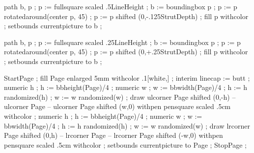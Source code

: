 
\usemodule[s][abr-02]
\usemodule[s][pre-60]






\setupcolors
  [textcolor=darkcolor]

\setupinteraction
  [color=darkcolor,
   contrastcolor=darkcolor]

    path b, p ;
    p := fullsquare scaled .5LineHeight ;
    b := boundingbox p ;
    p := p rotatedaround(center p, 45) ;
    p := p shifted (0,-.125StrutDepth) ;
    fill p withcolor  ;
    setbounds currentpicture to b ;
\stopuseMPgraphic

    path b, p ;
    p := fullsquare scaled .25LineHeight ;
    b := boundingbox p ;
    p := p rotatedaround(center p, 45) ;
    p := p shifted (0,+.25StrutDepth) ;
    fill p withcolor  ;
    setbounds currentpicture to b ;
\stopuseMPgraphic

    StartPage ;
        fill Page enlarged 5mm withcolor .1[white,] ;
        interim linecap := butt ;
        numeric h ; h := bbheight(Page)/4 ;
        numeric w ; w := bbwidth(Page)/4 ;
        h := h randomized(h) ;
        w := w randomized(w) ;
        draw
            ulcorner Page shifted (0,-h) -- ulcorner Page -- ulcorner Page shifted (w,0)
            withpen pensquare scaled .5cm
            withcolor  ;
        numeric h ; h := bbheight(Page)/4 ;
        numeric w ; w := bbwidth(Page)/4 ;
        h := h randomized(h) ;
        w := w randomized(w) ;
        draw
            lrcorner Page shifted (0,h) -- lrcorner Page -- lrcorner Page shifted (-w,0)
            withpen pensquare scaled .5cm
            withcolor  ;
        setbounds currentpicture to Page ;
    StopPage ;
\stopuseMPgraphic

